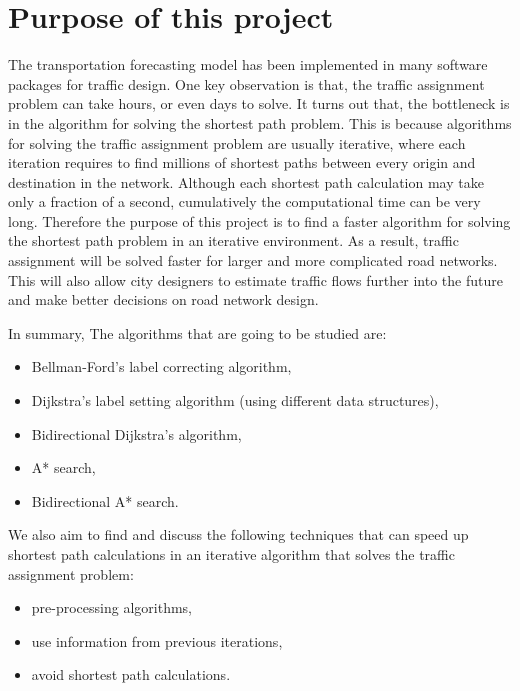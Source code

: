 \section{Purpose of this project}
The transportation forecasting model has been implemented in many software packages for traffic design.
One key observation is that,
the traffic assignment problem can take hours, or even days to solve.
It turns out that,
the bottleneck is in the algorithm for solving the shortest path problem.
This is because algorithms for solving the traffic assignment problem are usually iterative,
where each iteration requires to find millions of shortest paths between every origin and destination in the network.
Although each shortest path calculation may take only a fraction of a second,
cumulatively the computational time can be very long.
Therefore the purpose of this project is to find a faster algorithm for solving the shortest path problem in an iterative environment.
As a result, traffic assignment will be solved faster
for larger and more complicated road networks.
This will also allow city designers to estimate traffic flows further into the future and make better decisions on road network design.

In summary,
The algorithms that are going to be studied are:
\begin{itemize}
    \item Bellman-Ford's label correcting algorithm,
    \item Dijkstra's label setting algorithm (using different data structures),
    \item Bidirectional Dijkstra's algorithm,
    \item A* search,
    \item Bidirectional A* search.
\end{itemize}

We also aim to find and discuss the following techniques that can speed up shortest path calculations in an iterative algorithm that solves the traffic assignment problem:
\begin{itemize}
    \item pre-processing algorithms,
    \item use information from previous iterations,
    \item avoid shortest path calculations.
\end{itemize}

